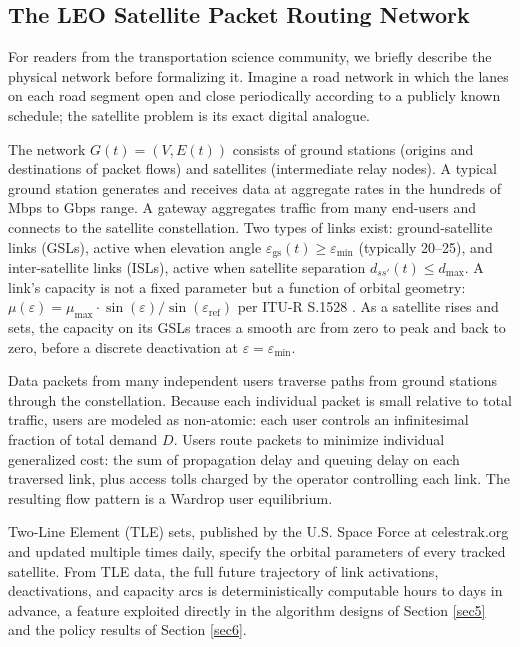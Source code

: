 \documentclass[review,3p,authoryear]{elsarticle}
\begin{document}
\subsection{The LEO Satellite Packet Routing Network}

For readers from the transportation science community, we briefly describe the physical network before formalizing it. Imagine a road network in which the lanes on each road segment open and close periodically according to a publicly known schedule; the satellite problem is its exact digital analogue.

The network $G(t) = (V, E(t))$ consists of ground stations (origins and destinations of packet flows) and satellites (intermediate relay nodes). A typical ground station generates and receives data at aggregate rates in the hundreds of Mbps to Gbps range. A gateway aggregates traffic from many end-users and connects to the satellite constellation. Two types of links exist: ground-satellite links (GSLs), active when elevation angle ${\varepsilon}_{\mathrm{gs}}(t) \ge {\varepsilon}_{\min}$ (typically 20--25\textdegree{}), and inter-satellite links (ISLs), active when satellite separation $d_{ss'}(t) \le d_{\max}$. A link's capacity is not a fixed parameter but a function of orbital geometry: ${\mu}({\varepsilon}) = {\mu}_{\max} \cdot \sin({\varepsilon})/\sin({\varepsilon}_{\mathrm{ref}})$ per ITU-R S.1528 \citet{ITUR}. As a satellite rises and sets, the capacity on its GSLs traces a smooth arc from zero to peak and back to zero, before a discrete deactivation at ${\varepsilon} = {\varepsilon}_{\min}$.

Data packets from many independent users traverse paths from ground stations through the constellation. Because each individual packet is small relative to total traffic, users are modeled as non-atomic: each user controls an infinitesimal fraction of total demand $D$. Users route packets to minimize individual generalized cost: the sum of propagation delay and queuing delay on each traversed link, plus access tolls charged by the operator controlling each link. The resulting flow pattern is a Wardrop user equilibrium.

Two-Line Element (TLE) sets, published by the U.S. Space Force at celestrak.org and updated multiple times daily, specify the orbital parameters of every tracked satellite. From TLE data, the full future trajectory of link activations, deactivations, and capacity arcs is deterministically computable hours to days in advance, a feature exploited directly in the algorithm designs of Section \ref{sec5} and the policy results of Section \ref{sec6}.
\end{document}
